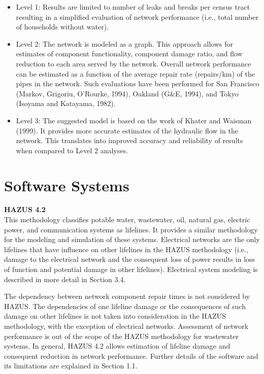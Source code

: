 \begin{itemize}
    \item Level 1: Results are limited to number of leaks and breaks per census tract resulting in a simplified evaluation of network performance (i.e., total number of households without water).
    \item Level 2: The network is modeled as a graph. This approach allows for estimates of component functionality, component damage ratio, and flow reduction to each area served by the network. Overall network performance can be estimated as a function of the average repair rate (repairs/km) of the pipes in the network. Such evaluations have been performed for San Francisco (Markov, Grigoriu, O’Rourke, 1994), Oakland (G\&E, 1994), and Tokyo (Isoyama and Katayama, 1982).
    \item Level 3: The suggested model is based on the work of Khater and Waisman (1999). It provides more accurate estimates of the hydraulic flow in the network. This translates into improved accuracy and reliability of results when compared to Level 2 analyses.
\end{itemize}

\section{Software Systems}
\label{sec:perf_pipeline_tools}

\noindent\textbf{HAZUS 4.2} \\This methodology classifies potable water, wastewater, oil, natural gas, electric power, and communication systems as lifelines. It provides a similar methodology for the modeling and simulation of these systems. Electrical networks are the only lifelines that have influence on other lifelines in the HAZUS methodology (i.e., damage to the electrical network and the consequent loss of power results in loss of function and potential damage in other lifelines). Electrical system modeling is described in more detail in Section 3.4.

The dependency between network component repair times is not considered by HAZUS. The dependencies of one lifeline damage or the consequences of such damage on other lifelines is not taken into consideration in the HAZUS methodology, with the exception of electrical networks. Assessment of network performance is out of the scope of the HAZUS methodology for wastewater systems. In general, HAZUS 4.2 allows estimation of lifeline damage and consequent reduction in network performance. Further details of the software and its limitations are explained in Section 1.1.
\newline

